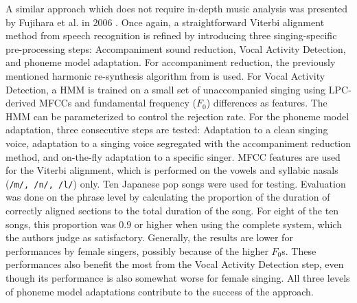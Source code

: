 A similar approach which does not require in-depth music analysis was presented by Fujihara et al. in 2006 \cite{fujihara_alignment}. Once again, a straightforward Viterbi alignment method from speech recognition is refined by introducing three singing-specific pre-processing steps: Accompaniment sound reduction, Vocal Activity Detection, and phoneme model adaptation.
For accompaniment reduction, the previously mentioned harmonic re-synthesis algorithm from \cite{fujihara_identification} is used. For Vocal Activity Detection, a HMM is trained on a small set of unaccompanied singing using LPC-derived MFCCs and fundamental frequency ($F_0$) differences as features. The HMM can be parameterized to control the rejection rate. For the phoneme model adaptation, three consecutive steps are tested: Adaptation to a clean singing voice, adaptation to a singing voice segregated with the accompaniment reduction method, and on-the-fly adaptation to a specific singer. MFCC features are used for the Viterbi alignment, which is performed on the vowels and syllabic nasals (\texttt{/m/, /n/, /l/}) only.
Ten Japanese pop songs were used for testing. Evaluation was done on the phrase level by calculating the proportion of the duration of correctly aligned sections to the total duration of the song. For eight of the ten songs, this proportion was $0.9$ or higher when using the complete system, which the authors judge as satisfactory. Generally, the results are lower for performances by female singers, possibly because of the higher $F_0$s. These performances also benefit the most from the Vocal Activity Detection step, even though its performance is also somewhat worse for female singing. All three levels of phoneme model adaptations contribute to the success of the approach.\\


